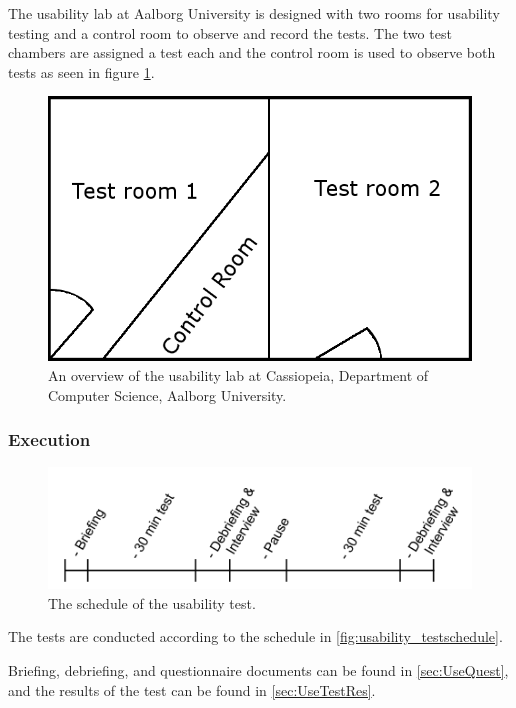 The usability lab at Aalborg University is designed with two rooms for usability testing and a control room to observe and record the tests.
The two test chambers are assigned a test each and the control room is used to observe both tests as seen in figure \ref{fig:test_setup}.

\begin{figure}[H]
	\centering
		\includegraphics[scale=0.70]{input/images/test_setup.png}
	\caption{An overview of the usability lab at Cassiopeia, Department of Computer Science, Aalborg University.}
	\label{fig:test_setup}
\end{figure}

\subsubsection*{Execution}

\begin{figure}[H]
	\centering
		\includegraphics[scale=0.70]{input/images/usability_testschedule.png}
	\caption{The schedule of the usability test.}
	\label{fig:usability_testschedule}
\end{figure}

The tests are conducted according to the schedule in \autoref{fig:usability_testschedule}.

Briefing, debriefing, and questionnaire documents can be found in \autoref {sec:UseQuest}, and the results of the test can be found in \autoref{sec:UseTestRes}.